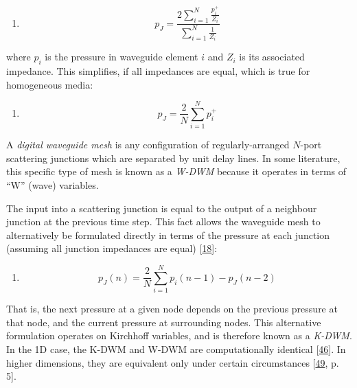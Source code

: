 \documentclass[]{scrreprt}
\providecommand{\tightlist}{%
  \setlength{\itemsep}{0pt}\setlength{\parskip}{0pt}}
\begin{document}
\begin{enumerate}
\def\labelenumi{(\arabic{enumi})}
\setcounter{enumi}{18}
\tightlist
\item
  \[p_J=\frac{2\sum_{i=1}^{N}\frac{p_i^+}{Z_i}}{\sum_{i=1}^{N}\frac{1}{Z_i}}\]
\end{enumerate}

where \(p_i\) is the pressure in waveguide element \(i\) and \(Z_i\) is
its associated impedance. This simplifies, if all impedances are equal,
which is true for homogeneous media:

\begin{enumerate}
\def\labelenumi{(\arabic{enumi})}
\setcounter{enumi}{19}
\tightlist
\item
  \[p_J=\frac{2}{N}\sum_{i=1}^{N}p_i^+\]
\end{enumerate}

A \emph{digital waveguide mesh} is any configuration of
regularly-arranged \(N\)-port scattering junctions which are separated
by unit delay lines. In some literature, this specific type of mesh is
known as a \emph{W-DWM} because it operates in terms of ``W'' (wave)
variables.

The input into a scattering junction is equal to the output of a
neighbour junction at the previous time step. This fact allows the
waveguide mesh to alternatively be formulated directly in terms of the
pressure at each junction (assuming all junction impedances are equal)
{[}\protect\hyperlink{ref-beesonux5froomweaver:ux5f2004}{18}{]}:

\begin{enumerate}
\def\labelenumi{(\arabic{enumi})}
\setcounter{enumi}{20}
\tightlist
\item
  \[p_J(n)=\frac{2}{N}\sum_{i=1}^{N}p_i(n-1)-p_J(n-2)\]
\end{enumerate}

That is, the next pressure at a given node depends on the previous
pressure at that node, and the current pressure at surrounding nodes.
This alternative formulation operates on Kirchhoff variables, and is
therefore known as a \emph{K-DWM}. In the 1D case, the K-DWM and W-DWM
are computationally identical
{[}\protect\hyperlink{ref-smithux5fiiiux5fequivalenceux5f2004}{46}{]}.
In higher dimensions, they are equivalent only under certain
circumstances {[}\protect\hyperlink{ref-murphyux5facousticux5f2007}{49},
p. 5{]}.
\end{document}
